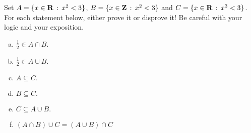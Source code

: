 Set $A=\{x\in\mathbf{R}\,:\,x^2<3\}$, $B=\{x\in\mathbf{Z}\,:\,x^2<3\}$ and $C=\{x\in\mathbf{R}\,:\,x^3<3\}$. For each statement below, either prove it or disprove it! Be careful with your logic and your exposition.
\begin{multicols}{2}
\begin{enumerate}[(a)]
\item $\frac{1}{2}\in A\cap B.$
\item $\frac{1}{2}\in A\cup B.$
\item $A\subseteq C.$
\item $B\subseteq C.$
\item $C\subseteq A\cup B.$
\item $(A\cap B)\cup C=(A\cup B)\cap C$
\end{enumerate}
\end{multicols}
